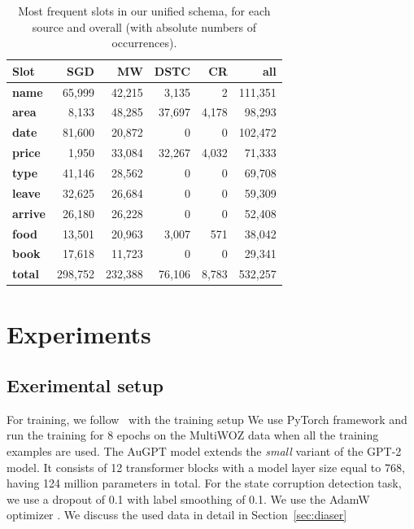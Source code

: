 \begin{table}[tp]
    \centering\footnotesize
    \begin{tabular}{l>{\hspace{-2mm}}rrrrr}
        \toprule
        \bf Slot &
        \textbf{SGD} & 
        \textbf{MW} &
        \textbf{DSTC} &
        \textbf{CR} &
         \textbf{all}\\ \midrule
        \textbf{name} & 65,999 & 42,215 & 3,135 & 2 & 111,351\\ 
        \textbf{area} & 8,133 & 48,285 & 37,697 & 4,178 & 98,293 \\ 
        \textbf{date} & 81,600 & 20,872 & 0 & 0 & 102,472\\
        \textbf{price} & 1,950 & 33,084 & 32,267 & 4,032 & 71,333\\
        \textbf{type}& 41,146 & 28,562 & 0 & 0 & 69,708\\
        \textbf{leave}& 32,625 & 26,684 & 0 & 0 & 59,309\\
        \textbf{arrive}& 26,180 & 26,228 & 0 & 0 & 52,408\\
        \textbf{food}& 13,501 & 20,963 & 3,007 & 571 & 38,042\\
        \textbf{book}& 17,618 & 11,723 & 0 & 0 & 29,341\\
        \midrule
        \textbf{total}& 298,752 & 232,388 & 76,106 & 8,783 & 532,257\\
        \bottomrule
    \end{tabular}
    \caption{Most frequent slots in our unified schema, for each source and overall (with absolute numbers of occurrences).}
    \label{tab:slots}
\end{table}

\section{Experiments}
\subsection{Exerimental setup}
For training, we follow~\citep{kulhanek-etal-2021-augpt} with the training setup
We use PyTorch framework \cite{pytorch} and run the training for 8 epochs on the MultiWOZ data when all the training examples are used.
The AuGPT model extends the \emph{small} variant of the GPT-2 model.
It consists of 12 transformer blocks with a model layer size equal to 768, having 124 million parameters in total.
For the state corruption detection task, we use a dropout of 0.1 with label smoothing of 0.1.
We use the AdamW optimizer \cite{DBLP:conf/iclr/LoshchilovH19}.
We discuss the used data in detail in Section~\ref{sec:diaser}
